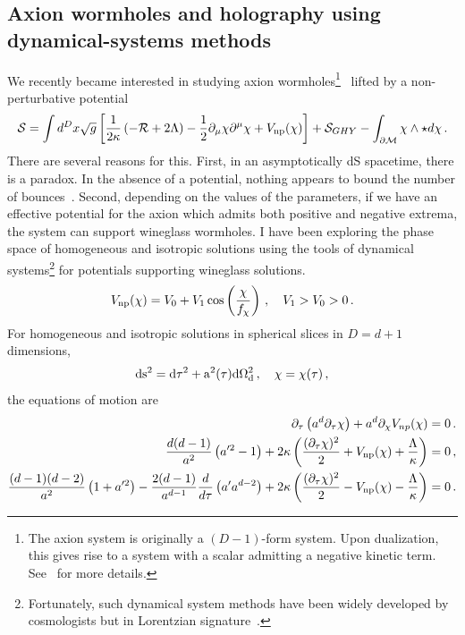 \documentclass[a4paper]{article}
\begin{document}
\subsection{Axion wormholes and holography using dynamical-systems methods}
\label{subsec:Axion}
We recently became interested in studying axion wormholes\footnote{The axion system is originally a $(D-1)$-form system. Upon dualization, this gives rise to a system with a scalar admitting a negative kinetic term. See~\cite{hertog2024stabilityaxionsaxionwormholes} for more details.}~\cite{Giddings:1987cg,witten2026dualityaxionwormholes} lifted by a non-perturbative potential~\cite{Hebecker_2017,Hebecker_2018}
\begin{equation}\label{eq:liftnonperturbative}
  \mathcal{S}=\int d^Dx \sqrt{g}\left[\frac{1}{2\kappa}\left(-\mathcal{R}+2\Lambda\right)-\frac{1}{2}\partial_\mu\chi \partial^\mu \chi + V_{\rm np}(\chi)\right]+ \mathcal{S}_{GHY} - \int_{\partial \mathcal{M}} \chi \wedge \star d \chi\,.
\end{equation}
There are several reasons for this. First, in an asymptotically dS spacetime, there is a paradox. In the absence of a potential, nothing appears to bound the number of bounces~\cite{aguilargutierrez2023axiondesitterwormholes}. Second, depending on the values of the parameters, if we have an effective potential for the axion which admits both positive and negative extrema, the system can support wineglass wormholes. I have been exploring the phase space of homogeneous and isotropic solutions using the tools of dynamical systems\footnote{Fortunately, such dynamical system methods have been widely developed by cosmologists but in Lorentzian signature~\cite{Bahamonde_2018,Cindy_Ng_2000,PhysRevD.57.4642}.} for potentials supporting wineglass solutions.
\begin{equation}
  V_{\rm np}(\chi) = V_0 + V_1 \cos\left(\frac{\chi}{f_{\chi}}\right)\,, \quad V_1 >V_0>0\,.
\end{equation} 
For homogeneous and isotropic solutions in spherical slices in $D=d+1$ dimensions,
\begin{equation}
  \rm{d}s^2 = \rm{d}\tau^2 + a^2(\tau)\rm{d}\Omega_d^2\,, \quad \chi = \chi(\tau)\,,
\end{equation} 
the equations of motion are
\begin{equation}\label{eq:Nequal1gauge}
  \begin{aligned}
    \partial_\tau\left(a^d\partial_\tau \chi\right)+a^{d}\partial_{\chi}V_{np}(\chi)&=0\,.\\
    \frac{d(d-1)}{a^2}\left(a'^2-1\right)+2\kappa\left(\frac{(\partial_\tau \chi)^2}{2}+V_{\rm np}(\chi)+\frac{\Lambda}{\kappa}\right)&=0\,,\\
    \frac{(d-1)(d-2)}{a^2}\left(1+a'^2\right)-\frac{2(d-1)}{a^{d-1}}\frac{d}{d\tau}\left(a'a^{d-2}\right)+2\kappa \left(\frac{(\partial_\tau \chi)^2}{2}-V_{\rm np}(\chi)-\frac{\Lambda}{\kappa}\right)&=0\,.
  \end{aligned}
\end{equation}
\end{document}
